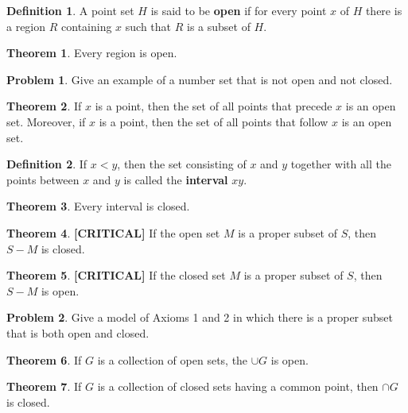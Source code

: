 \documentclass{article}
\theoremstyle{definition}
\newtheorem{definition}{Definition}
\newtheorem{theorem}{Theorem}
\theoremstyle{definition}
\newtheorem{problem}{Problem}
\theoremstyle{plain}
\begin{document}
\begin{definition}
  A point set $H$ is said to be \textbf{open} if for every point $x$ of $H$
  there is a region $R$ containing $x$ such that $R$ is a subset of $H$.
\end{definition}

\begin{theorem}
  Every region is open.
\end{theorem}

\begin{problem}
  Give an example of a number set that is not open and not closed.
\end{problem}

\begin{theorem}
  If $x$ is a point, then the set of all points that precede $x$ is an open
  set.  Moreover, if $x$ is a point, then the set of all points that follow $x$
  is an open set.
\end{theorem}

\begin{definition}
  If $x < y$, then the set consisting of $x$ and $y$ together with all the
  points between $x$ and $y$ is called the \textbf{interval} $xy$.
\end{definition}

\begin{theorem}
  Every interval is closed.
\end{theorem}

\begin{theorem}
  \textbf{[CRITICAL]} If the open set $M$ is a proper subset of $S$, then $S -
  M$ is closed.
\end{theorem}

\begin{theorem}
  \textbf{[CRITICAL]} If the closed set $M$ is a proper subset of $S$, then $S
  - M$ is open.
\end{theorem}

\begin{problem}
  Give a model of Axioms 1 and 2 in which there is a proper subset that is both
  open and closed.
\end{problem}

\begin{theorem}
  If $G$ is a collection of open sets, the $\cup G$ is open.
\end{theorem}

\begin{theorem}
  If $G$ is a collection of closed sets having a common point, then $\cap G$ is
  closed.
\end{theorem}
\end{document}
